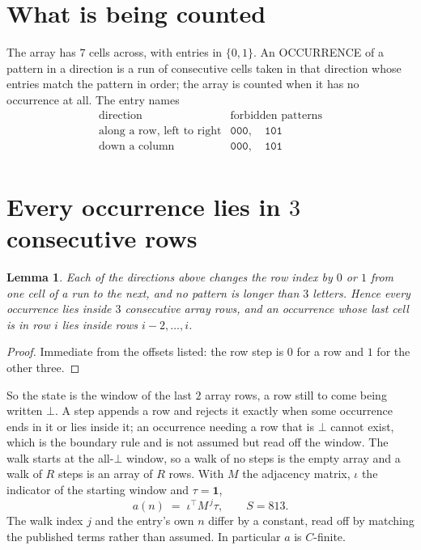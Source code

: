 \documentclass[11pt,a4paper]{article}
\theoremstyle{plain}
\newtheorem{lemma}[theorem]{Lemma}
\theoremstyle{definition}
\begin{document}
\section{What is being counted}

The array has $7$ cells across, with entries in $\{0,1\}$. An OCCURRENCE of a pattern in a
direction is a run of consecutive cells taken in that direction whose entries match the pattern
in order; the array is counted when it has no occurrence at all. The entry names
\[
\begin{array}{ll}
\text{direction} & \text{forbidden patterns} \\[2pt]
\text{along a row, left to right} & \mathtt{000},\quad \mathtt{101} \\
\text{down a column} & \mathtt{000},\quad \mathtt{101} \\
\end{array}
\]


\section{Every occurrence lies in $3$ consecutive rows}

\begin{lemma}\label{lem:win}
Each of the directions above changes the row index by $0$ or $1$ from one cell of a run to the
next, and no pattern is longer than $3$ letters. Hence every occurrence lies inside $3$
consecutive array rows, and an occurrence whose last cell is in row $i$ lies inside rows
$i-2,\dots,i$.
\end{lemma}

\begin{proof}
Immediate from the offsets listed: the row step is $0$ for a row and $1$ for the other three.
\end{proof}

So the state is the window of the last $2$ array rows, a row still to come being written
$\bot$. A step appends a row and rejects it exactly when some occurrence ends in it or lies
inside it; an occurrence needing a row that is $\bot$ cannot exist, which is the boundary rule
and is not assumed but read off the window. The walk starts at the all-$\bot$ window, so a walk
of no steps is the empty array and a walk of $R$ steps is an array of $R$ rows. With $M$ the
adjacency matrix, $\iota$ the indicator of the starting window and $\tau=\mathbf{1}$,
\[
a(n)\;=\;\iota^{\!\top}M^{\,j}\tau ,\qquad S=813.
\]
The walk index $j$ and the entry's own $n$ differ by a constant, read off by matching the
published terms rather than assumed. In particular $a$ is $C$-finite.
\end{document}
